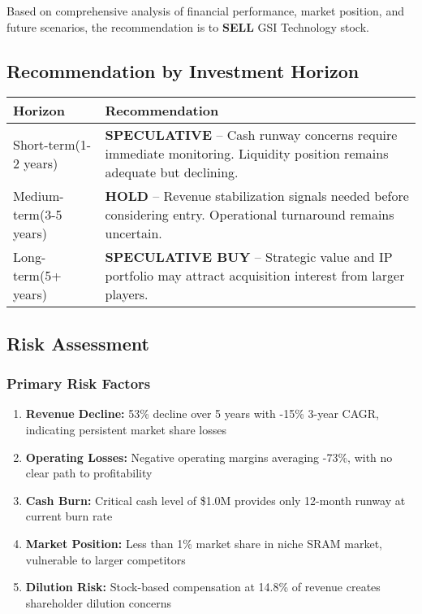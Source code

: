 \documentclass[11pt,a4paper]{article}
\begin{document}
Based on comprehensive analysis of financial performance, market position, and future scenarios, the recommendation is to \textbf{SELL} GSI Technology stock.

\vspace{0.5cm}

\subsection{Recommendation by Investment Horizon}

\begin{center}
\begin{tabular}{p{3cm}p{10cm}}
\toprule
\textbf{Horizon} & \textbf{Recommendation} \\
\midrule
Short-term\newline(1-2 years) & \textbf{SPECULATIVE} -- Cash runway concerns require immediate monitoring. Liquidity position remains adequate but declining. \\
Medium-term\newline(3-5 years) & \textbf{HOLD} -- Revenue stabilization signals needed before considering entry. Operational turnaround remains uncertain. \\
Long-term\newline(5+ years) & \textbf{SPECULATIVE BUY} -- Strategic value and IP portfolio may attract acquisition interest from larger players. \\
\bottomrule
\end{tabular}
\end{center}

\vspace{0.5cm}

\subsection{Risk Assessment}

\subsubsection{Primary Risk Factors}

\begin{enumerate}
\setlength{\itemsep}{0.4em}
\item \textbf{Revenue Decline:} 53\% decline over 5 years with -15\% 3-year CAGR, indicating persistent market share losses
\item \textbf{Operating Losses:} Negative operating margins averaging -73\%, with no clear path to profitability
\item \textbf{Cash Burn:} Critical cash level of \$1.0M provides only 12-month runway at current burn rate
\item \textbf{Market Position:} Less than 1\% market share in niche SRAM market, vulnerable to larger competitors
\item \textbf{Dilution Risk:} Stock-based compensation at 14.8\% of revenue creates shareholder dilution concerns
\end{enumerate}
\end{document}
